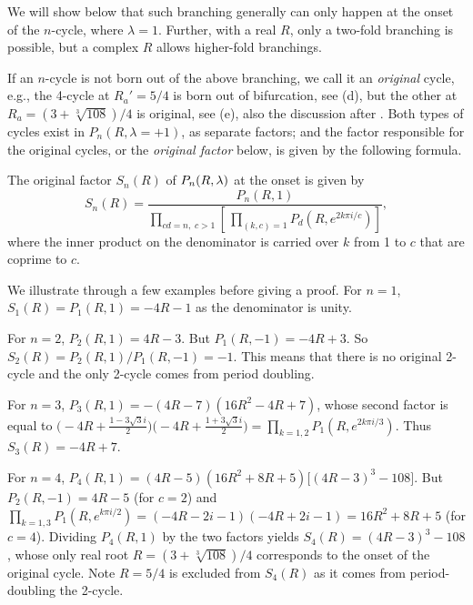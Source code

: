 \documentclass[preprint]{revtex4-1}
\begin{document}
We will show below that such branching generally can only happen
  at the onset of the $n$-cycle, where $\lambda = 1$.
%
Further, with a real $R$, only a two-fold branching is possible,
  but a complex $R$ allows higher-fold branchings.



If an $n$-cycle is not born out of the above branching,
  we call it an \emph{original} cycle,
  e.g., the 4-cycle at $R_a' = 5/4$
  is born out of bifurcation, see (d),
  but the other at $R_a = (3+\sqrt[3]{108})/4$
  is original, see (e),
  also the discussion after .
%
Both types of cycles exist in $P_n(R, \lambda = +1)$,
  as separate factors;
and the factor responsible for the original cycles,
  or the \emph{original factor} below,
  is given by the following formula.


\begin{theorem}
  The original factor $S_n(R)$ of $P_n(R, \lambda)$ at the onset is given by
  \begin{equation}
    S_n(R)
    = \frac
    {
      P_n(R, 1)
    }
    {
      \prod_{c d =  n, \; c > 1}
      \left[ \,
        \prod_{(k, c) = 1}
      P_{d}
        \left(
          R, e^{2k\pi i/c}
        \right)
      \right]
    },
  \label{eq:origfac}
  \end{equation}
  where the inner product on the denominator is carried over
   $k$ from 1 to $c$ that are coprime to $c$.
  \label{thm:origfac}
\end{theorem}

We illustrate  through a few examples
  before giving a proof.
%
For $n = 1$,
$S_1(R) = P_1(R, 1) = -4R - 1$
as the denominator is unity.


For $n = 2$,
$P_2(R, 1) = 4R - 3$.
But $P_1(R, -1) = -4R + 3$.
So $S_2(R) = P_2(R, 1)/P_1(R, -1) = -1$.
This means that there is no original 2-cycle
  and the only 2-cycle comes from period doubling.


For $n = 3$,
$P_3(R, 1) = -(4R - 7)(16 R^2 - 4 R + 7)$,
whose second factor is equal to
$
\big(-4R + \frac{1 - 3 \sqrt3 i}{2}\big)
\big(-4R + \frac{1 + 3 \sqrt3 i}{2}\big)
= \prod_{k=1,2} P_1(R, e^{2 k \pi i/3})$.
%
Thus $S_3(R) = -4R + 7$.



For $n = 4$,
$P_4(R, 1)
= (4R - 5) (16 R^2 + 8 R + 5)
  \bigl[
    (4R - 3)^3 - 108
  \bigr]$.
But
$P_2(R, -1) = 4R - 5$ (for $c = 2$)
and
$\prod_{k=1,3} P_1(R, e^{k\pi i/2})
=(-4R-2i-1)(-4R+2i-1)
=16R^2+8R+5$
(for $c = 4$).
Dividing $P_4(R, 1)$ by the two factors yields
$S_4(R) = (4R-3)^3 - 108$,
  whose only real root $R=(3+\sqrt[3]{108})/4$ corresponds to
  the onset of the original cycle.
Note $R = 5/4$ is excluded from $S_4(R)$
  as it comes from period-doubling the 2-cycle.
\end{document}
